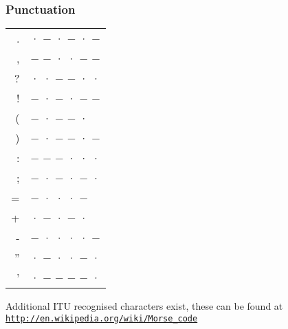 	\subsubsection*{Punctuation}
	
		\begin{tabular}{rl}
			. & · − · − · − \\ 
			, & − − · · − − \\ 
			? & · · − − · · \\ 
			! & − · − · − − \\ 
			( & − · − − · \\ 
			) & − · − − · − \\ 
			: & − − − · · · \\
			; & − · − · − · \\
			= & − · · · − \\ 
			+ & · − · − · \\
			- & − · · · · − \\ 
			'' & · − · · − · \\
			' & · − − − − · \\
		\end{tabular}\textbf{}
	
		\ifprint
		\else
			Additional ITU recognised characters exist, these can be found at \href{https://en.wikipedia.org/wiki/Morse_code#Letters.2C_numbers.2C_punctuation.2C_prosigns_for_Morse_code_and_non-English_variants}{\texttt{http://en.wikipedia.org/wiki/Morse\_code}}
		\fi

\iffalse

	\subsection*{Example Phrases}

		\begin{verbatim}
· · ·   − − −   · · ·
 S       O       S
		\end{verbatim}
		SOS

		\begin{verbatim}
· · · ·   ·   · − · ·   · − · ·   − − −
  H     E     L        L        O 
		\end{verbatim}
		Hello

		\begin{verbatim}
· − − − −   · · − − −       · · · − −
    1             2     SPACE     3
		\end{verbatim}
		12 3 (\textit{not} 1 2 3)

		\begin{verbatim}
· · ·   −   · − ·   − · − − ·   − · − − · −
 S     T     R         (             )
		\end{verbatim}
		str()
	
		\begin{verbatim}
· ·   − · · · −   · ·   · − · − ·   · − − − −
 I       =       I       +           1
		\end{verbatim}
		i = i+1

\fi

\normalsize
